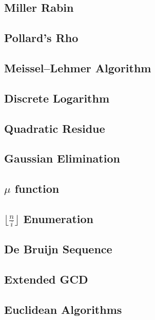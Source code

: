 \documentclass[a4paper,10pt,twocolumn,oneside]{article}
\begin{document}
\subsection{Miller Rabin}

\subsection{Pollard's Rho}

\subsection{Meissel–Lehmer Algorithm}

\subsection{Discrete Logarithm}

\subsection{Quadratic Residue}

\subsection{Gaussian Elimination}

% 
\subsection{$\mu$ function}

\subsection{$\lfloor \frac{n}{i} \rfloor$ Enumeration}

\subsection{De Bruijn Sequence}

\subsection{Extended GCD}

\subsection{Euclidean Algorithms}

\end{document}

